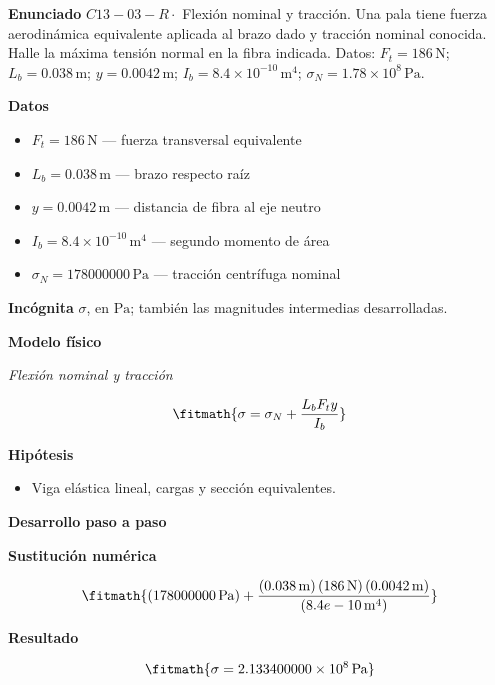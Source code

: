 \documentclass[10pt,openany]{book}
\begin{document}
\begin{tcolorbox}[title={Problema resuelto 3}, studiumworked, breakable]

\noindent\textbf{Enunciado}
\(C13-03-R \cdot\) Flexión nominal y tracción. Una pala tiene fuerza aerodinámica equivalente aplicada al brazo dado y tracción nominal conocida. Halle la máxima tensión normal en la fibra indicada. Datos: \(F_t=186\, \mathrm{N}\); \(L_b=0.038\, \mathrm{m}\); \(y=0.0042\, \mathrm{m}\); \(I_b=8.4\times 10^{-10}\, \mathrm{m}^{4}\); \(\sigma_N=1.78\times 10^{8}\, \mathrm{Pa}\).

\noindent\textbf{Datos}
\begin{itemize}
\item $F_t = 186\,\mathrm{N}$ — fuerza transversal equivalente
\item $L_b = 0.038\,\mathrm{m}$ — brazo respecto raíz
\item $y = 0.0042\,\mathrm{m}$ — distancia de fibra al eje neutro
\item $I_b = 8.4\times 10^{-10}\,\mathrm{m}^{4}$ — segundo momento de área
\item $\sigma_N = 178000000\,\mathrm{Pa}$ — tracción centrífuga nominal
\end{itemize}

\noindent\textbf{Incógnita}
$\sigma$, en $\mathrm{Pa}$; también las magnitudes intermedias desarrolladas.

\noindent\textbf{Modelo físico}

\noindent\textit{Flexión nominal y tracción}

\[
\fitmath{\sigma=\sigma_N + \frac{L_b F_t y}{I_b}}
\]

\noindent\textbf{Hipótesis}
\begin{itemize}
\item Viga elástica lineal, cargas y sección equivalentes.
\end{itemize}

\noindent\textbf{Desarrollo paso a paso}



\noindent\textbf{Sustitución numérica}

\[
\fitmath{\left(178000000\,\mathrm{Pa}\right) + \frac{\left(0.038\,\mathrm{m}\right) \left(186\,\mathrm{N}\right) \left(0.0042\,\mathrm{m}\right)}{\left(8.4e-10\,\mathrm{m}^{4}\right)}}
\]

\noindent\textbf{Resultado}

\[
\fitmath{\sigma=2.133400000\times10^{8}\,\mathrm{Pa}}
\]


\end{tcolorbox}
\end{document}
